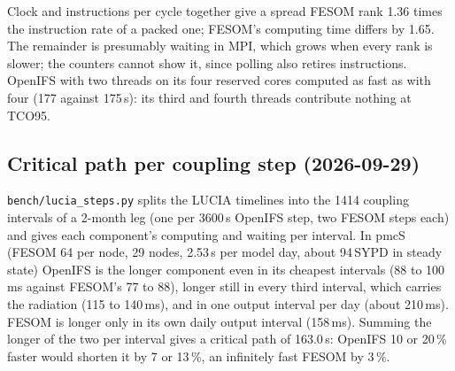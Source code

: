 \documentclass[11pt,a4paper]{article}
\begin{document}
Clock and instructions per cycle together give a spread FESOM rank 1.36 times the instruction rate of a packed one; FESOM's computing time differs by 1.65. The remainder is presumably waiting in MPI, which grows when every rank is slower; the counters cannot show it, since polling also retires instructions. OpenIFS with two threads on its four reserved cores computed as fast as with four (177 against 175\,s): its third and fourth threads contribute nothing at TCO95.

\subsection{Critical path per coupling step (2026-09-29)}
\texttt{bench/lucia\_steps.py} splits the LUCIA timelines into the 1414 coupling intervals of a 2-month leg (one per 3600\,s OpenIFS step, two FESOM steps each) and gives each component's computing and waiting per interval. In pmcS (FESOM 64 per node, 29 nodes, 2.53\,s per model day, about 94\,SYPD in steady state) OpenIFS is the longer component even in its cheapest intervals (88 to 100\,ms against FESOM's 77 to 88), longer still in every third interval, which carries the radiation (115 to 140\,ms), and in one output interval per day (about 210\,ms). FESOM is longer only in its own daily output interval (158\,ms). Summing the longer of the two per interval gives a critical path of 163.0\,s: OpenIFS 10 or 20\,\% faster would shorten it by 7 or 13\,\%, an infinitely fast FESOM by 3\,\%.
\end{document}
